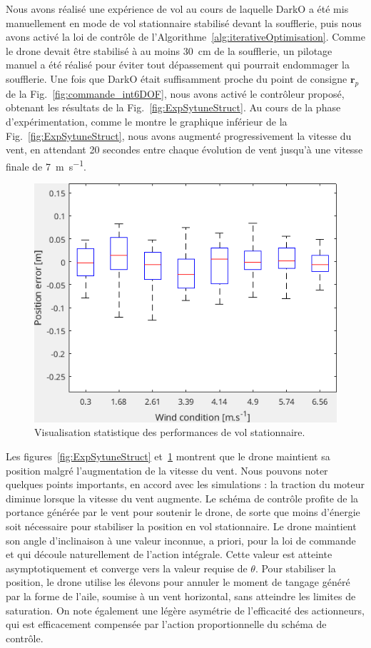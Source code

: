 Nous avons réalisé une expérience de vol au cours de laquelle DarkO a été mis manuellement en mode de vol stationnaire stabilisé devant la soufflerie, puis nous avons activé la loi de contrôle de l'Algorithme~\ref{alg:iterativeOptimisation}. Comme le drone devait être stabilisé à au moins \SI{30}{\centi\meter} de la soufflerie, un pilotage manuel a été réalisé pour éviter tout dépassement qui pourrait endommager la soufflerie. Une fois que DarkO était suffisamment proche du point de consigne $\boldsymbol{r}_{p}$ de la Fig.~\ref{fig:commande_int6DOF}, nous avons activé le contrôleur proposé, obtenant les résultats de la Fig.~\ref{fig:ExpSytuneStruct}. Au cours de la phase d'expérimentation, comme le montre le graphique inférieur de la Fig.~\ref{fig:ExpSytuneStruct}, nous avons augmenté progressivement la vitesse du vent, en attendant 20 secondes entre chaque évolution de vent jusqu'à une vitesse finale de \SI{7}{\meter\per\second}.


\begin{figure}[ht!]
    \centering
    \includegraphics[trim=0cm 0cm 0cm 0cm,clip,width=0.6\columnwidth]{figures/boxplot.png}
    \caption{Visualisation statistique des performances de vol stationnaire.}
    \label{fig:statpos}
\end{figure}

Les figures~\ref{fig:ExpSytuneStruct} et~\ref{fig:statpos} montrent que le drone maintient sa position malgré l'augmentation de la vitesse du vent. Nous pouvons noter quelques points importants, en accord avec les simulations : la traction du moteur diminue lorsque la vitesse du vent augmente. Le schéma de contrôle profite de la portance générée par le vent pour soutenir le drone, de sorte que moins d'énergie soit nécessaire pour stabiliser la position en vol stationnaire. Le drone maintient son angle d'inclinaison à une valeur inconnue, a priori, pour la loi de commande et qui découle naturellement de l'action intégrale. Cette valeur est atteinte asymptotiquement et converge vers la valeur requise de $\theta$. Pour stabiliser la position, le drone utilise les élevons pour annuler le moment de tangage généré par la forme de l'aile, soumise à un vent horizontal, sans atteindre les limites de saturation.
On note également une légère asymétrie de l'efficacité des actionneurs, qui est efficacement compensée par l'action proportionnelle du schéma de contrôle.


